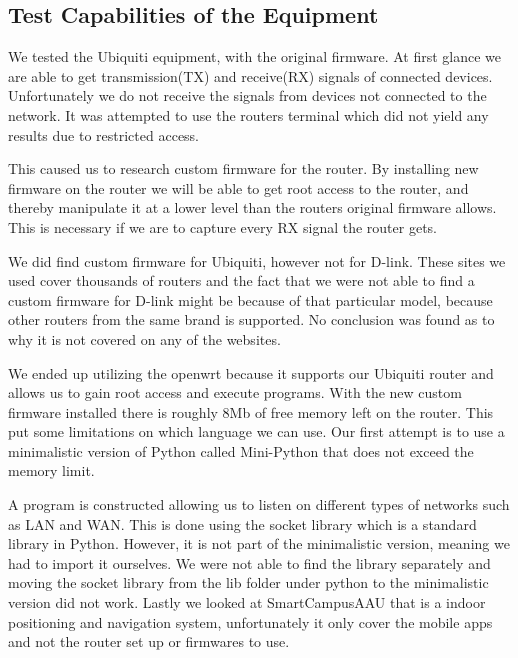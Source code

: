 \subsection*{Test Capabilities of the Equipment}
We tested the Ubiquiti equipment, with the original firmware. At first glance we are able to get transmission(TX) and receive(RX) signals of connected devices. Unfortunately we do not receive the signals from devices not connected to the network. It was attempted to use the routers terminal which did not yield any results due to restricted access.

This caused us to research custom firmware for the router. By installing new firmware on the router we will be able to get root access to the router, and thereby manipulate it at a lower level than the routers original firmware allows. This is necessary if we are to capture every RX signal the router gets.

We did find custom firmware for Ubiquiti, however not for D-link. These sites we used cover thousands of routers and the fact that we were not able to find a custom firmware for D-link might be because of that particular model, because other routers from the same brand is supported. No conclusion was found as to why it is not covered on any of the websites\cite{firmware_1}\cite{firmware_2}\cite{firmware_3}\cite{firmware_4}\cite{firmware_5}\cite{firmware_6}.

We ended up utilizing the openwrt because it supports our Ubiquiti router and allows us to gain root access and execute programs. With the new custom firmware installed there is roughly 8Mb of free memory left on the router. This put some limitations on which language we can use. Our first attempt is to use a minimalistic version of Python called Mini-Python that does not exceed the memory limit.

A program is constructed allowing us to listen on different types of networks such as LAN and WAN. This is done using the socket library which is a standard library in Python. However, it is not part of the minimalistic version, meaning we had to import it ourselves. We were not able to find the library separately and moving the socket library from the lib folder under python to the minimalistic version did not work. Lastly we looked at SmartCampusAAU that is a indoor positioning and navigation system, unfortunately it only cover the mobile apps and not the router set up or firmwares to use.

